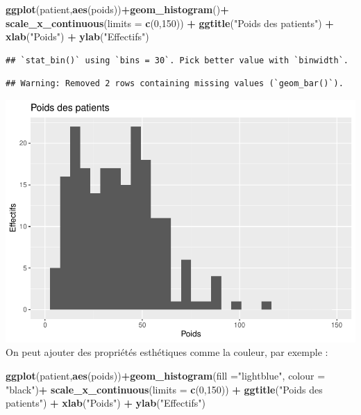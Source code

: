 \documentclass[
]{book}
\newenvironment{Shaded}{\begin{snugshade}}{\end{snugshade}}
\newcommand{\AttributeTok}[1]{\textcolor[rgb]{0.13,0.29,0.53}{#1}}
\newcommand{\DecValTok}[1]{\textcolor[rgb]{0.00,0.00,0.81}{#1}}
\newcommand{\FunctionTok}[1]{\textcolor[rgb]{0.13,0.29,0.53}{\textbf{#1}}}
\newcommand{\NormalTok}[1]{#1}
\newcommand{\SpecialCharTok}[1]{\textcolor[rgb]{0.81,0.36,0.00}{\textbf{#1}}}
\newcommand{\StringTok}[1]{\textcolor[rgb]{0.31,0.60,0.02}{#1}}
\begin{document}
\begin{Shaded}
\begin{Highlighting}[]
\FunctionTok{ggplot}\NormalTok{(patient,}\FunctionTok{aes}\NormalTok{(poids))}\SpecialCharTok{+}\FunctionTok{geom\_histogram}\NormalTok{()}\SpecialCharTok{+}
  \FunctionTok{scale\_x\_continuous}\NormalTok{(}\AttributeTok{limits =} \FunctionTok{c}\NormalTok{(}\DecValTok{0}\NormalTok{,}\DecValTok{150}\NormalTok{)) }\SpecialCharTok{+} 
  \FunctionTok{ggtitle}\NormalTok{(}\StringTok{"Poids des patients"}\NormalTok{) }\SpecialCharTok{+} 
  \FunctionTok{xlab}\NormalTok{(}\StringTok{"Poids"}\NormalTok{) }\SpecialCharTok{+} 
  \FunctionTok{ylab}\NormalTok{(}\StringTok{"Effectifs"}\NormalTok{)}
\end{Highlighting}
\end{Shaded}

\begin{verbatim}
## `stat_bin()` using `bins = 30`. Pick better value with `binwidth`.
\end{verbatim}

\begin{verbatim}
## Warning: Removed 2 rows containing missing values (`geom_bar()`).
\end{verbatim}

\includegraphics{_main_files/figure-latex/ggplot6-1.pdf}
On peut ajouter des propriétés esthétiques comme la couleur, par exemple :

\begin{Shaded}
\begin{Highlighting}[]
\FunctionTok{ggplot}\NormalTok{(patient,}\FunctionTok{aes}\NormalTok{(poids))}\SpecialCharTok{+}\FunctionTok{geom\_histogram}\NormalTok{(}\AttributeTok{fill =}\StringTok{"lightblue"}\NormalTok{, }\AttributeTok{colour =} \StringTok{"black"}\NormalTok{)}\SpecialCharTok{+}
  \FunctionTok{scale\_x\_continuous}\NormalTok{(}\AttributeTok{limits =} \FunctionTok{c}\NormalTok{(}\DecValTok{0}\NormalTok{,}\DecValTok{150}\NormalTok{)) }\SpecialCharTok{+} 
  \FunctionTok{ggtitle}\NormalTok{(}\StringTok{"Poids des patients"}\NormalTok{) }\SpecialCharTok{+} 
  \FunctionTok{xlab}\NormalTok{(}\StringTok{"Poids"}\NormalTok{) }\SpecialCharTok{+} 
  \FunctionTok{ylab}\NormalTok{(}\StringTok{"Effectifs"}\NormalTok{)}
\end{Highlighting}
\end{Shaded}
\end{document}
